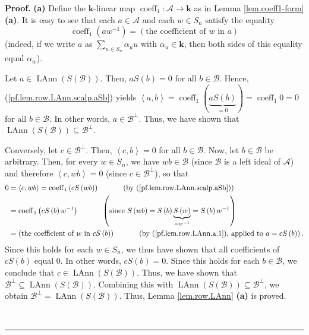 \documentclass[numbers=enddot,12pt,final,onecolumn,notitlepage]{scrartcl}%
\numberwithin{exer}{subsection}
\theoremstyle{definition}
\newenvironment{proof}[1][Proof]{\noindent\textbf{#1.} }{\ \rule{0.5em}{0.5em}}
\let\sumnonlimits\sum
\renewcommand{\sum}{\sumnonlimits\limits}
\begin{document}
\begin{proof}
\textbf{(a)} Define the $\mathbf{k}$-linear map $\operatorname*{coeff}%
\nolimits_{1}:\mathcal{A}\rightarrow\mathbf{k}$ as in Lemma
\ref{lem.coeff1-form} \textbf{(a)}. It is easy to see that each $a\in
\mathcal{A}$ and each $w\in S_{n}$ satisfy the equality%
\begin{equation}
\operatorname*{coeff}\nolimits_{1}\left(  aw^{-1}\right)  =\left(  \text{the
coefficient of }w\text{ in }a\right)  \label{pf.lem.row.LAnn.a.1}%
\end{equation}
(indeed, if we write $a$ as $\sum_{u\in S_{n}}\alpha_{u}u$ with $\alpha_{u}%
\in\mathbf{k}$, then both sides of this equality equal $\alpha_{w}$).

Let $a\in\operatorname*{LAnn}\left(  S\left(  \mathcal{B}\right)  \right)  $.
Then, $aS\left(  b\right)  =0$ for all $b\in\mathcal{B}$. Hence,
(\ref{pf.lem.row.LAnn.scalp.aSb}) yields $\left\langle a,b\right\rangle
=\operatorname*{coeff}\nolimits_{1}\left(  \underbrace{aS\left(  b\right)
}_{=0}\right)  =\operatorname*{coeff}\nolimits_{1}0=0$ for all $b\in
\mathcal{B}$. In other words, $a\in\mathcal{B}^{\perp}$. Thus, we have shown
that $\operatorname*{LAnn}\left(  S\left(  \mathcal{B}\right)  \right)
\subseteq\mathcal{B}^{\perp}$.

Conversely, let $c\in\mathcal{B}^{\perp}$. Then, $\left\langle
c,b\right\rangle =0$ for all $b\in\mathcal{B}$. Now, let $b\in\mathcal{B}$ be
arbitrary. Then, for every $w\in S_{n}$, we have $wb\in\mathcal{B}$ (since
$\mathcal{B}$ is a left ideal of $\mathcal{A}$) and therefore $\left\langle
c,wb\right\rangle =0$ (since $c\in\mathcal{B}^{\perp}$), so that%
\begin{align*}
0  &  =\left\langle c,wb\right\rangle =\operatorname*{coeff}\nolimits_{1}%
\left(  cS\left(  wb\right)  \right)  \ \ \ \ \ \ \ \ \ \ \left(  \text{by
(\ref{pf.lem.row.LAnn.scalp.aSb})}\right) \\
&  =\operatorname*{coeff}\nolimits_{1}\left(  cS\left(  b\right)
w^{-1}\right)  \ \ \ \ \ \ \ \ \ \ \left(  \text{since }S\left(  wb\right)
=S\left(  b\right)  \underbrace{S\left(  w\right)  }_{=w^{-1}}=S\left(
b\right)  w^{-1}\right) \\
&  =\left(  \text{the coefficient of }w\text{ in }cS\left(  b\right)  \right)
\ \ \ \ \ \ \ \ \ \ \left(  \text{by (\ref{pf.lem.row.LAnn.a.1}), applied to
}a=cS\left(  b\right)  \right)  .
\end{align*}
Since this holds for each $w\in S_{n}$, we thus have shown that all
coefficients of $cS\left(  b\right)  $ equal $0$. In other words, $cS\left(
b\right)  =0$. Since this holds for each $b\in\mathcal{B}$, we conclude that
$c\in\operatorname*{LAnn}\left(  S\left(  \mathcal{B}\right)  \right)  $.
Thus, we have shown that $\mathcal{B}^{\perp}\subseteq\operatorname*{LAnn}%
\left(  S\left(  \mathcal{B}\right)  \right)  $. Combining this with
$\operatorname*{LAnn}\left(  S\left(  \mathcal{B}\right)  \right)
\subseteq\mathcal{B}^{\perp}$, we obtain $\mathcal{B}^{\perp}%
=\operatorname*{LAnn}\left(  S\left(  \mathcal{B}\right)  \right)  $. Thus,
Lemma \ref{lem.row.LAnn} \textbf{(a)} is proved. \medskip


\end{proof}
\end{document}
